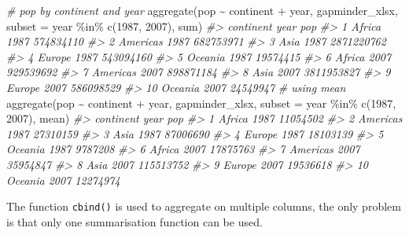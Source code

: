 \documentclass[
]{book}
\newenvironment{Shaded}{\begin{snugshade}}{\end{snugshade}}
\newcommand{\AttributeTok}[1]{\textcolor[rgb]{0.77,0.63,0.00}{#1}}
\newcommand{\CommentTok}[1]{\textcolor[rgb]{0.56,0.35,0.01}{\textit{#1}}}
\newcommand{\DecValTok}[1]{\textcolor[rgb]{0.00,0.00,0.81}{#1}}
\newcommand{\FunctionTok}[1]{\textcolor[rgb]{0.00,0.00,0.00}{#1}}
\newcommand{\NormalTok}[1]{#1}
\newcommand{\SpecialCharTok}[1]{\textcolor[rgb]{0.00,0.00,0.00}{#1}}
\begin{document}
\begin{Shaded}
\begin{Highlighting}[]
\CommentTok{\# pop by continent and year}
\FunctionTok{aggregate}\NormalTok{(pop }\SpecialCharTok{\textasciitilde{}}\NormalTok{ continent }\SpecialCharTok{+}\NormalTok{ year, }
\NormalTok{          gapminder\_xlsx, }
          \AttributeTok{subset =}\NormalTok{ year }\SpecialCharTok{\%in\%} \FunctionTok{c}\NormalTok{(}\DecValTok{1987}\NormalTok{, }\DecValTok{2007}\NormalTok{), }
\NormalTok{          sum)}
\CommentTok{\#\textgreater{}    continent year        pop}
\CommentTok{\#\textgreater{} 1     Africa 1987  574834110}
\CommentTok{\#\textgreater{} 2   Americas 1987  682753971}
\CommentTok{\#\textgreater{} 3       Asia 1987 2871220762}
\CommentTok{\#\textgreater{} 4     Europe 1987  543094160}
\CommentTok{\#\textgreater{} 5    Oceania 1987   19574415}
\CommentTok{\#\textgreater{} 6     Africa 2007  929539692}
\CommentTok{\#\textgreater{} 7   Americas 2007  898871184}
\CommentTok{\#\textgreater{} 8       Asia 2007 3811953827}
\CommentTok{\#\textgreater{} 9     Europe 2007  586098529}
\CommentTok{\#\textgreater{} 10   Oceania 2007   24549947}
\CommentTok{\# using mean}
\FunctionTok{aggregate}\NormalTok{(pop }\SpecialCharTok{\textasciitilde{}}\NormalTok{ continent }\SpecialCharTok{+}\NormalTok{ year, }
\NormalTok{          gapminder\_xlsx, }
          \AttributeTok{subset =}\NormalTok{ year }\SpecialCharTok{\%in\%} \FunctionTok{c}\NormalTok{(}\DecValTok{1987}\NormalTok{, }\DecValTok{2007}\NormalTok{), }
\NormalTok{          mean)}
\CommentTok{\#\textgreater{}    continent year       pop}
\CommentTok{\#\textgreater{} 1     Africa 1987  11054502}
\CommentTok{\#\textgreater{} 2   Americas 1987  27310159}
\CommentTok{\#\textgreater{} 3       Asia 1987  87006690}
\CommentTok{\#\textgreater{} 4     Europe 1987  18103139}
\CommentTok{\#\textgreater{} 5    Oceania 1987   9787208}
\CommentTok{\#\textgreater{} 6     Africa 2007  17875763}
\CommentTok{\#\textgreater{} 7   Americas 2007  35954847}
\CommentTok{\#\textgreater{} 8       Asia 2007 115513752}
\CommentTok{\#\textgreater{} 9     Europe 2007  19536618}
\CommentTok{\#\textgreater{} 10   Oceania 2007  12274974}
\end{Highlighting}
\end{Shaded}

The function \texttt{cbind()} is used to aggregate on multiple columns, the only problem is that only one summarisation function can be used.
\end{document}
